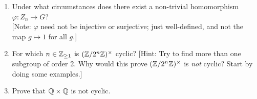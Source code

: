 \documentclass[11pt, reqno]{amsart}
\theoremstyle{plain}
\theoremstyle{definition}
\theoremstyle{example}
\def\f{\varphi}
\begin{document}
\begin{enumerate}[1.]
\begin{enumerate}
\begin{proof}
Suppose that $\sigma_a$ is an automorphism of $Z_n$. Then $\sigma_a$ is a bijective homomorphism from $Z_n \to Z_n$.
\end{proof}
\item Under what circumstances does there exist a non-trivial homomorphism $\f: Z_n \to G$? \\{\small[Note: $\f$ need not be injective or surjective; just well-defined, and not the map $g \mapsto 1$ for all $g$.]}
\item For which $n \in \mathbb{Z}_{\ge 1}$ is $(\mathbb{Z}/2^n\mathbb{Z})^\times$ cyclic? \hfill {\small[Hint: Try to find more than one subgroup of order 2. Why would this prove $(\mathbb{Z}/2^n\mathbb{Z})^\times$ is \emph{not} cyclic? Start by doing some examples.]}
\item Prove that $\mathbb{Q} \times \mathbb{Q}$ is not cyclic.
\end{enumerate}


\end{enumerate}
\end{document}
